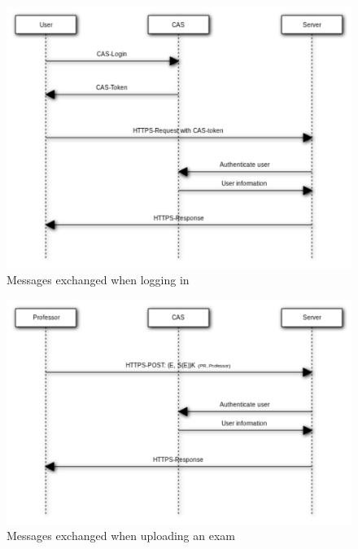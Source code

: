\documentclass{article}
\begin{document}
\begin{figure}
\begin{center}
\includegraphics[width=\textwidth]{images/login.pdf}
\caption{Messages exchanged when logging in}
\label{fig:log-in}
\end{center}
\end{figure}

\begin{figure}
\begin{center}
\includegraphics[width=\textwidth]{images/upload_exam.pdf}
\caption{Messages exchanged when uploading an exam}
\label{fig:log-in}
\end{center}
\end{figure}
\end{document}
